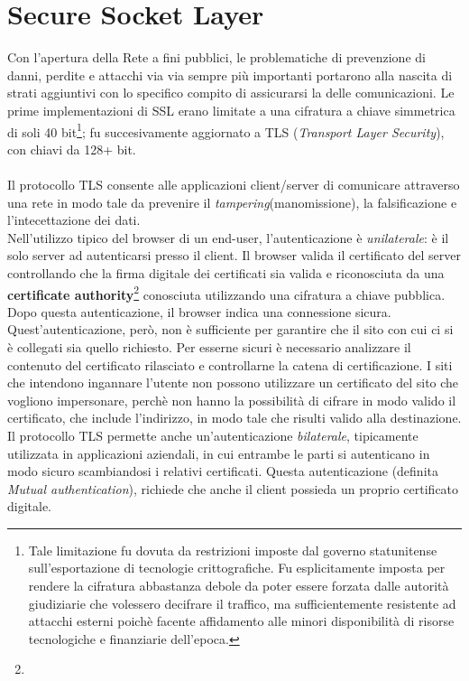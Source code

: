 \section{Secure Socket Layer}
Con l'apertura della Rete a fini pubblici, le problematiche di prevenzione di danni, perdite e attacchi via via sempre più importanti portarono alla nascita di strati aggiuntivi con lo specifico compito di assicurarsi la delle comunicazioni.
Le prime implementazioni di SSL erano limitate a una cifratura a chiave simmetrica di soli 40 bit\footnote{Tale limitazione fu dovuta da restrizioni imposte dal governo statunitense sull'esportazione di tecnologie crittografiche. Fu esplicitamente imposta per rendere la cifratura abbastanza debole da poter essere forzata dalle autorità giudiziarie che volessero decifrare il traffico, ma sufficientemente resistente ad attacchi esterni poichè facente affidamento alle minori disponibilità di risorse tecnologiche e finanziarie dell'epoca.}; fu succesivamente aggiornato a TLS (\textit{Transport Layer Security}), con chiavi da 128+ bit.\\\\
Il protocollo TLS consente alle applicazioni client/server di comunicare attraverso una rete in modo tale da prevenire il \textit{tampering}(manomissione), la falsificazione e l'intecettazione dei dati.\\
Nell'utilizzo tipico del browser di un end-user, l'autenticazione è \textit{unilaterale}: è il solo server ad autenticarsi presso il client. Il browser valida il certificato del server controllando che la firma digitale dei certificati sia valida e riconosciuta da una \textbf{certificate authority}\footnote{} conosciuta utilizzando una cifratura a chiave pubblica. Dopo questa autenticazione, il browser indica una connessione sicura.\\
Quest'autenticazione, però, non è sufficiente per garantire che il sito con cui ci si è collegati sia quello richiesto. Per esserne sicuri è necessario analizzare il contenuto del certificato rilasciato e controllarne la catena di certificazione. I siti che intendono ingannare l'utente non possono utilizzare un certificato del sito che vogliono impersonare, perchè non hanno la possibilità di cifrare in modo valido il certificato, 
che include l'indirizzo, in modo tale che risulti valido alla destinazione.\\
Il protocollo TLS permette anche un'autenticazione \textit{bilaterale}, tipicamente utilizzata in applicazioni aziendali, in cui entrambe le parti si autenticano in modo sicuro scambiandosi i relativi certificati. Questa autenticazione (definita \textit\textit{Mutual authentication}), richiede che anche il client possieda un proprio certificato digitale.\\

